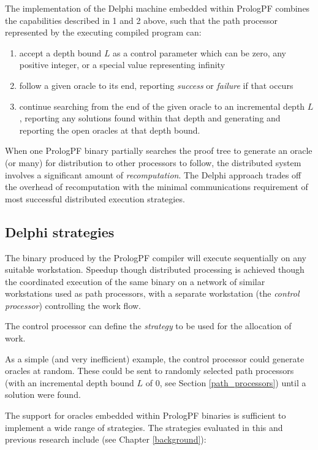 The implementation of the Delphi machine embedded within PrologPF combines the
capabilities described in 1 and 2 above, such that the path processor represented
by the executing compiled program can:
\begin{enumerate}
\item{accept a depth bound $L$ as a control parameter which can be zero, any
  positive integer, or a special value representing infinity}
\item{follow a given oracle to its end, reporting \textit{success} or
  \textit{failure} if that occurs}
\item{continue searching from the end of the given oracle to an incremental
  depth $L$, reporting any solutions found within that depth and generating
  and reporting the open oracles at that depth bound.}
\end{enumerate}

When one PrologPF binary partially searches the proof tree to generate
an oracle (or many) for distribution to other processors to follow,
the distributed system involves a significant amount 
of \textit{recomputation}.
The Delphi approach trades off the overhead of recomputation with the minimal
communications requirement of most successful distributed execution
strategies.

\subsection{Delphi strategies}
\label{delphi_strategies}

The binary produced by the PrologPF compiler will execute sequentially on
any suitable workstation.  Speedup though distributed processing is
achieved though the coordinated execution of the same binary on a network
of similar workstations used as path processors, with a separate
workstation (the \textit{control processor}) controlling the work flow.

The control processor can define the \textit{strategy} to be used for
the allocation of work.

As a simple (and very inefficient) example, the control processor could
generate oracles at random.  These could be sent to randomly selected
path processors (with an incremental depth bound $L$ of 0, see Section
\ref{path_processors}) until a solution were found.

The support for oracles embedded within PrologPF binaries is sufficient to
implement a wide range of strategies.  The strategies evaluated in this and
previous research include (see Chapter \ref{background}):

